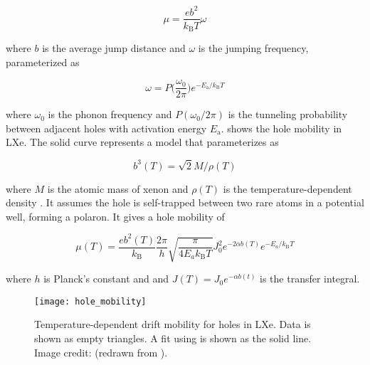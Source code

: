 \begin{equation}
\mu = \frac{e b^2}{k_{\mathrm{B}} T} \omega
\label{eq:importance_procedure_effects_charge_mobility_simple}
\end{equation}

\noindent where $b$ is the average jump distance and $\omega$ is the jumping frequency, parameterized as

\vspace{-20pt}

\begin{equation}
\omega = P \Big( \frac{\omega_0}{2 \pi} \Big) e^{-E_{\mathrm{a}} / k_{\mathrm{B}} T}
\end{equation}

\noindent where $\omega_0$ is the phonon frequency and $P(\omega_0 / 2 \pi)$ is the tunneling probability between adjacent holes with
activation energy $E_{\mathrm{a}}$.   shows the hole mobility in
LXe.  The solid curve represents a model that parameterizes  as

\vspace{-15pt}

\begin{equation}
b^3(T) = \sqrt{2} M / \rho (T)
\end{equation}

\noindent where $M$ is the atomic mass of xenon and $\rho (T)$ is the temperature-dependent density .  It
assumes the hole is self-trapped between two rare atoms in a potential well, forming a polaron.  It gives a hole mobility of

\vspace{-5pt}

\begin{equation}
\mu (T) = \frac{e b^2 (T)}{k_{\mathrm{B}}} \frac{2 \pi}{h} \sqrt{\frac{\pi}{4 E_a k_{\mathrm{B}} T}} J_0^2
e^{-2 \alpha b(T)} e^{-E_a / k_{\mathrm{B}} T}
\label{eq:importance_procedure_effects_charge_mobility_polaron}
\end{equation}

\noindent where $h$ is Planck's constant and and $J(T) = J_0 e^{-\alpha b(t)}$ is the transfer integral.

\begin{figure}
\centering
\texttt{[image: hole\_mobility]}
\caption{Temperature-dependent drift mobility for holes in LXe.  Data is shown as empty triangles.  A fit
using  is shown as the solid line.  Image credit: 
(redrawn from ).}
\label{fig:importance_procedure_effects_charge_hole_mobility}
\end{figure}

